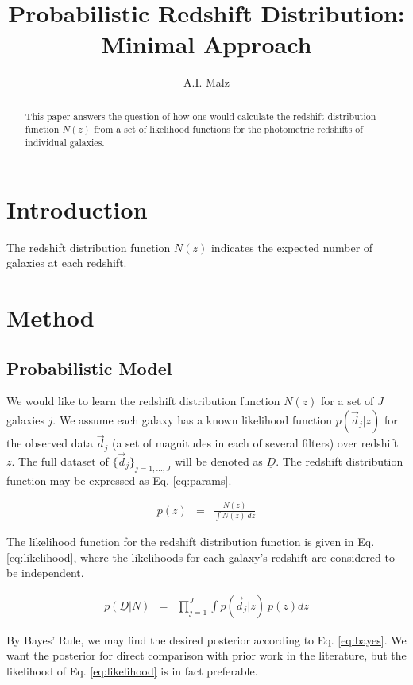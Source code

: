 \documentclass[12pt, onecolumn]{emulateapj}
\newcommand{\textul}{\underline}
\begin{document}
\title{Probabilistic Redshift Distribution: Minimal Approach}

\author{A.I. Malz}

\begin{abstract}
This paper answers the question of how one would calculate the redshift distribution function $N(z)$ from a set of likelihood functions for the photometric redshifts of individual galaxies.
\end{abstract}


\section{Introduction}

The redshift distribution function $N(z)$ indicates the expected number of galaxies at each redshift.

\section{Method}

\subsection{Probabilistic Model}

We would like to learn the redshift distribution function $N(z)$ for a set of $J$ galaxies $j$.  We assume each galaxy has a known likelihood function $p(\vec{d}_{j}|z)$ for the observed data $\vec{d}_{j}$ (a set of magnitudes in each of several filters) over redshift $z$.  The full dataset of $\{\vec{d}_{j}\}_{j=1,\dots,J}$ will be denoted as $\textul{D}$.  The redshift distribution function may be expressed as Eq. \ref{eq:params}.

\begin{eqnarray}
\label{eq:params}
p(z) &=& \frac{N(z)}{\int N(z)\ dz}
\end{eqnarray}

The likelihood function for the redshift distribution function is given in Eq. \ref{eq:likelihood}, where the likelihoods for each galaxy's redshift are considered to be independent.  

\begin{eqnarray}
\label{eq:likelihood}
p(\textul{D}|N) &=& \prod_{j=1}^{J}\int p(\vec{d}_{j}|z)\ p(z)dz
\end{eqnarray}

By Bayes' Rule, we may find the desired posterior according to Eq. \ref{eq:bayes}.  We want the posterior for direct comparison with prior work in the literature, but the likelihood of Eq. \ref{eq:likelihood} is in fact preferable.
\end{document}
